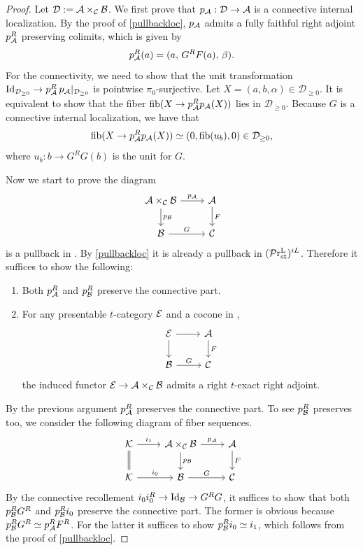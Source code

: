 \documentclass[a4paper,10pt, oneside]{amsart}
\begin{document}
	\begin{proof}
		Let $\mathcal{D}:=\mathcal{A}\times_{\mathcal{C}}\mathcal{B}$. We first prove that $p_{\mathcal{A}}: \mathcal{D} \to \mathcal{A}$ is a connective internal localization. By the proof of \cref{pullbackloc}, $p_{\mathcal{A}}$ admits a fully faithful right adjoint $p_{\mathcal{A}}^R$ preserving colimits, which is given by
		$$p_{\mathcal{A}}^R(a) = (a,\, G^R F(a),\, \beta).$$
		For the connectivity, we need to show that the unit transformation $\mathrm{Id}_{\mathcal{D}_{\geq 0}} \to p_{\mathcal{A}}^R\, p_{\mathcal{A}}|_{\mathcal{D}_{\geq 0}}$ is pointwise $\pi_0$-surjective. Let $X = (a, b, \alpha) \in \mathcal{D}_{\geq 0}$.  It is equivalent to show that the  fiber $\mathrm{fib}(X\to p_{\mathcal{A}}^R p_{\mathcal{A}}(X))$ lies in $\mathcal{D}_{\geq 0}$.
		Because $G$ is a connective internal localization, we have that $$\mathrm{fib}(X\to p_{\mathcal{A}}^R p_{\mathcal{A}}(X))\simeq (0,\mathrm{fib}(u_b),0)\in \mathcal{D}_{\geq 0},$$ where $u_b: b \to G^R G(b)$ is the unit for $G$.
		
		Now we start to prove the diagram 
		$$
		\begin{tikzcd}
			\mca\times_{\mcc}\mcb \arrow[d, "p_{\mcb}"] \arrow[r, "p_{\mca}"] & \mca \arrow[d, "F"] \\
			\mcb \arrow[r, "G"]                                               & \mcc               
		\end{tikzcd}
		$$ is a pullback in \prtil. By \cref{pullbackloc} it is already a pullback in $(\mathcal{P}\mathrm{r}_{\mathrm{st}}^\mathrm{L})^{iL}$. Therefore  it suffices to show the following:
		\begin{enumerate}
			\item Both $p_{\mathcal{A}}^R$ and $p_{\mathcal{B}}^R$ preserve the connective part.
			\item For any presentable $t$-category $\mathcal{E}$ and a cocone in \prtil, 
			$$\begin{tikzcd}
				\mce \arrow[d, ] \arrow[r, ] & \mca \arrow[d, "F"] \\
				\mcb \arrow[r, "G"]                                               & \mcc               
			\end{tikzcd}$$
			the induced functor $\mathcal{E}\to\mathcal{A}\times_{\mathcal{C}}\mathcal{B}$ admits a right $t$-exact right adjoint.
		\end{enumerate}
		By the previous argument $p_{\mathcal{A}}^R$ preserves  the connective part. To see $p_{\mathcal{B}}^R$ preserves too, we consider the following diagram of fiber sequences.
		$$
		\begin{tikzcd}
			\mck \arrow[r, "i_1"] \arrow[d, Rightarrow, no head] & \mca\times_{\mcc}\mcb \arrow[d, "p_{\mcb}"] \arrow[r, "p_{\mca}"] & \mca \arrow[d, "F"] \\
			\mck \arrow[r, "i_0"]                                & \mcb \arrow[r, "G"]                                               & \mcc               
		\end{tikzcd}
		$$
		By the connective recollement $i_0i_0^R\to \mathrm{Id}_{\mathcal{B}}\to G^RG$, it suffices to show that both $p_{\mathcal{B}}^RG^R$ and $p_{\mathcal{B}}^Ri_0$ preserve  the connective part. The former is obvious because $p_{\mathcal{B}}^RG^R\simeq p_{\mathcal{A}}^RF^R$. For the latter it suffices to show $p_{\mathcal{B}}^Ri_0\simeq i_1$, which follows from the proof of \cref{pullbackloc}.
		

\end{proof}
\end{document}
